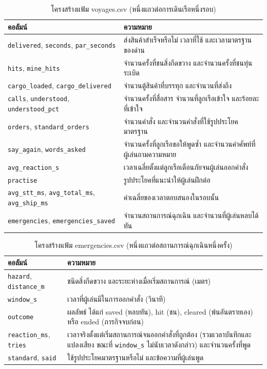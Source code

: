 \begin{table}[!htbp]
\centering
\caption{โครงสร้างแฟ้ม voyages.csv (หนึ่งแถวต่อการเดินเรือหนึ่งรอบ)}
\label{tab:data_voyages}
\begin{tabular}{|L{4.90cm}|L{8.80cm}|}
\hline
\textbf{คอลัมน์} & \textbf{ความหมาย} \\
\hline
\texttt{delivered}, \texttt{seconds}, \texttt{par\_seconds} & ส่งสินค้าสำเร็จหรือไม่ เวลาที่ใช้ และเวลามาตรฐานของด่าน \\ \hline
\texttt{hits}, \texttt{mine\_hits} & จำนวนครั้งที่ชนสิ่งกีดขวาง และจำนวนครั้งที่ชนทุ่นระเบิด \\ \hline
\texttt{cargo\_loaded}, \texttt{cargo\_delivered} & จำนวนตู้สินค้าที่บรรทุก และจำนวนที่ส่งถึง \\ \hline
\texttt{calls}, \texttt{understood}, \texttt{understood\_pct} & จำนวนครั้งที่สื่อสาร จำนวนที่ลูกเรือเข้าใจ และร้อยละที่เข้าใจ \\ \hline
\texttt{orders}, \texttt{standard\_orders} & จำนวนคำสั่ง และจำนวนคำสั่งที่ใช้รูปประโยคมาตรฐาน \\ \hline
\texttt{say\_again}, \texttt{words\_asked} & จำนวนครั้งที่ลูกเรือขอให้พูดซ้ำ และจำนวนคำศัพท์ที่ผู้เล่นถามความหมาย \\ \hline
\texttt{avg\_reaction\_s} & เวลาเฉลี่ยตั้งแต่ลูกเรือเตือนภัยจนผู้เล่นออกคำสั่ง \\ \hline
\texttt{practise} & รูปประโยคที่แนะนำให้ผู้เล่นฝึกต่อ \\ \hline
\texttt{avg\_stt\_ms}, \texttt{avg\_total\_ms}, \texttt{avg\_ship\_ms} & ค่าเฉลี่ยของเวลาตอบสนองในรอบนั้น \\ \hline
\texttt{emergencies}, \texttt{emergencies\_saved} & จำนวนสถานการณ์ฉุกเฉิน และจำนวนที่ผู้เล่นหลบได้ทัน \\
\hline
\end{tabular}
\end{table}

\begin{table}[!htbp]
\centering
\caption{โครงสร้างแฟ้ม emergencies.csv (หนึ่งแถวต่อสถานการณ์ฉุกเฉินหนึ่งครั้ง)}
\label{tab:data_emergencies}
\begin{tabular}{|L{4.90cm}|L{8.80cm}|}
\hline
\textbf{คอลัมน์} & \textbf{ความหมาย} \\
\hline
\texttt{hazard}, \texttt{distance\_m} & ชนิดสิ่งกีดขวาง และระยะห่างเมื่อเริ่มสถานการณ์ (เมตร) \\ \hline
\texttt{window\_s} & เวลาที่ผู้เล่นมีในการออกคำสั่ง (วินาที) \\ \hline
\texttt{outcome} & ผลลัพธ์ ได้แก่ saved (หลบทัน), hit (ชน), cleared (พ้นอันตรายเอง) หรือ ended (ภารกิจจบก่อน) \\ \hline
\texttt{reaction\_ms}, \texttt{tries} & เวลาจริงตั้งแต่เริ่มสถานการณ์จนออกคำสั่งที่ถูกต้อง (รวมเวลาบันทึกและแปลงเสียง ขณะที่ \texttt{window\_s} ไม่นับเวลาดังกล่าว) และจำนวนครั้งที่พูด \\ \hline
\texttt{standard}, \texttt{said} & ใช้รูปประโยคมาตรฐานหรือไม่ และข้อความที่ผู้เล่นพูด \\
\hline
\end{tabular}
\end{table}

